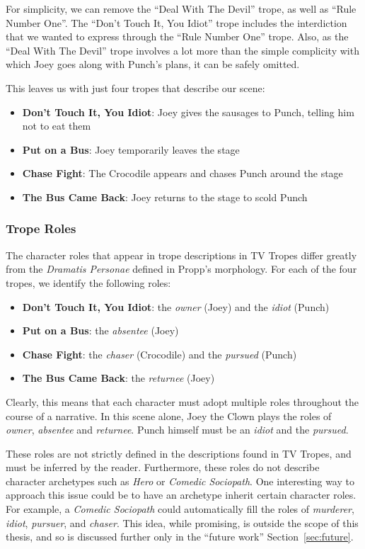 \documentclass[11pt]{report}
\begin{document}
For simplicity, we can remove the ``Deal With The Devil'' trope, as well as
``Rule Number One''. The ``Don't Touch It, You Idiot'' trope includes the
interdiction that we wanted to express through the ``Rule Number One'' trope.
Also, as the ``Deal With The Devil'' trope involves a lot more than the simple
complicity with which Joey goes along with Punch's plans, it can be safely omitted.

This leaves us with just four tropes that describe our scene:

\begin{itemize}
\item\textbf{Don't Touch It, You Idiot}: Joey gives the sausages to Punch,
  telling him not to eat them
\item\textbf{Put on a Bus}: Joey temporarily leaves the stage
\item\textbf{Chase Fight}: The Crocodile appears and chases Punch around the stage
\item\textbf{The Bus Came Back}: Joey returns to the stage to scold Punch
\end{itemize}

\subsubsection{Trope Roles}
The character roles that appear in trope descriptions in TV Tropes differ
greatly from the \emph{Dramatis Personae} defined in Propp's morphology. For
each of the four tropes, we identify the following roles:

\begin{itemize}
\item \textbf{Don't Touch It, You Idiot}: the \emph{owner} (Joey) and the \emph{idiot} (Punch)
\item \textbf{Put on a Bus}: the \emph{absentee} (Joey)
\item \textbf{Chase Fight}: the \emph{chaser} (Crocodile) and the \emph{pursued} (Punch)
\item \textbf{The Bus Came Back}: the \emph{returnee} (Joey)
\end{itemize}

Clearly, this means that each character must adopt multiple roles throughout the
course of a narrative. In this scene alone, Joey the Clown plays the roles of
\emph{owner}, \emph{absentee} and \emph{returnee}. Punch himself must be an
\emph{idiot} and the \emph{pursued}.

These roles are not strictly defined in the descriptions found in TV Tropes, and
must be inferred by the reader. Furthermore, these roles do not describe
character archetypes such as \emph{Hero} or \emph{Comedic Sociopath}. One
interesting way to approach this issue could be to have an archetype inherit certain
character roles. For example, a \emph{Comedic Sociopath} could automatically
fill the roles of \emph{murderer}, \emph{idiot}, \emph{pursuer}, and
\emph{chaser}. This idea, while promising, is outside the scope of this thesis,
and so is discussed further only in the ``future work'' Section~\ref{sec:future}.
\end{document}
